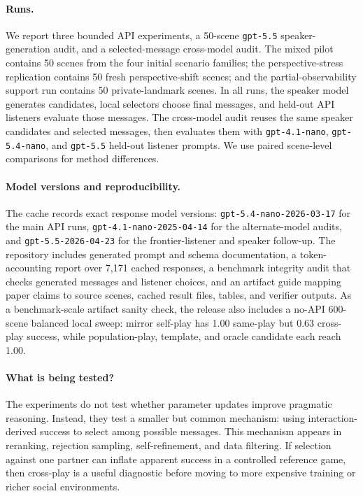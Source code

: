 \documentclass[10pt]{article}
\begin{document}
\paragraph{Runs.}
We report three bounded API experiments, a 50-scene \texttt{gpt-5.5} speaker-generation audit, and a selected-message cross-model audit. The mixed pilot contains 50 scenes from the four initial scenario families; the perspective-stress replication contains 50 fresh perspective-shift scenes; and the partial-observability support run contains 50 private-landmark scenes. In all runs, the speaker model generates candidates, local selectors choose final messages, and held-out API listeners evaluate those messages. The cross-model audit reuses the same speaker candidates and selected messages, then evaluates them with \texttt{gpt-4.1-nano}, \texttt{gpt-5.4-nano}, and \texttt{gpt-5.5} held-out listener prompts. We use paired scene-level comparisons for method differences.

\paragraph{Model versions and reproducibility.}
The cache records exact response model versions: \texttt{\footnotesize gpt-5.4-nano-2026-03-17} for the main API runs, \texttt{\footnotesize gpt-4.1-nano-2025-04-14} for the alternate-model audits, and \texttt{\footnotesize gpt-5.5-2026-04-23} for the frontier-listener and speaker follow-up. The repository includes generated prompt and schema documentation, a token-accounting report over 7,171 cached responses, a benchmark integrity audit that checks generated messages and listener choices, and an artifact guide mapping paper claims to source scenes, cached result files, tables, and verifier outputs. As a benchmark-scale artifact sanity check, the release also includes a no-API 600-scene balanced local sweep: mirror self-play has 1.00 same-play but 0.63 cross-play success, while population-play, template, and oracle candidate each reach 1.00.

\paragraph{What is being tested?}
The experiments do not test whether parameter updates improve pragmatic reasoning. Instead, they test a smaller but common mechanism: using interaction-derived success to select among possible messages. This mechanism appears in reranking, rejection sampling, self-refinement, and data filtering. If selection against one partner can inflate apparent success in a controlled reference game, then cross-play is a useful diagnostic before moving to more expensive training or richer social environments.
\end{document}

